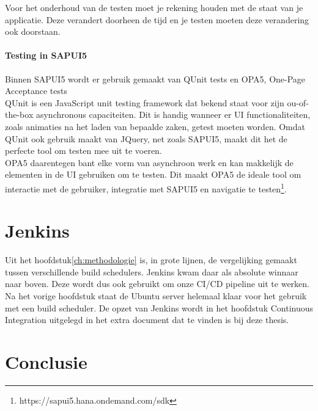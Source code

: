 Voor het onderhoud van de testen moet je rekening houden met de staat van je applicatie. Deze verandert doorheen de tijd en je testen moeten deze verandering ook doorstaan.

    \paragraph{Testing in SAPUI5}
    Binnen SAPUI5 wordt er gebruik gemaakt van QUnit tests en OPA5, One-Page Acceptance tests\\
    QUnit is een JavaScript unit testing framework dat bekend staat voor zijn ou-of-the-box asynchronous capaciteiten. Dit is handig wanneer er UI functionaliteiten, zoals animaties na het laden van bepaalde zaken, getest moeten worden. Omdat QUnit ook gebruik maakt van JQuery, net zoals SAPUI5, maakt dit het de perfecte tool om testen mee uit te voeren.\\
    OPA5 daarentegen bant elke vorm van asynchroon werk en kan makkelijk de elementen in de UI gebruiken om te testen. Dit maakt OPA5 de ideale tool om interactie met de gebruiker, integratie met SAPUI5 en navigatie te testen\footnote{https://sapui5.hana.ondemand.com/sdk}.
    
\section{Jenkins}
\label{sec:short-list}
Uit het hoofdstuk\ref{ch:methodologie} is, in grote lijnen, de vergelijking gemaakt tussen verschillende build schedulers. Jenkins kwam daar als absolute winnaar naar boven. Deze wordt dus ook gebruikt om onze CI/CD pipeline uit te werken.
Na het vorige hoofdstuk staat de Ubuntu server helemaal klaar voor het gebruik met een build scheduler. De opzet van Jenkins wordt in het hoofdstuk Continuous Integration uitgelegd in het extra document dat te vinden is bij deze thesis.
    
\section{Conclusie}
\label{sec:conclusie}
